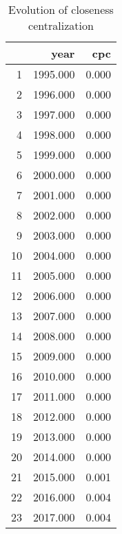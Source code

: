\begin{table}[ht]
\centering
\begin{tabular}{rrr}
  \hline
 & year & cpc \\ 
  \hline
1 & 1995.000 & 0.000 \\ 
  2 & 1996.000 & 0.000 \\ 
  3 & 1997.000 & 0.000 \\ 
  4 & 1998.000 & 0.000 \\ 
  5 & 1999.000 & 0.000 \\ 
  6 & 2000.000 & 0.000 \\ 
  7 & 2001.000 & 0.000 \\ 
  8 & 2002.000 & 0.000 \\ 
  9 & 2003.000 & 0.000 \\ 
  10 & 2004.000 & 0.000 \\ 
  11 & 2005.000 & 0.000 \\ 
  12 & 2006.000 & 0.000 \\ 
  13 & 2007.000 & 0.000 \\ 
  14 & 2008.000 & 0.000 \\ 
  15 & 2009.000 & 0.000 \\ 
  16 & 2010.000 & 0.000 \\ 
  17 & 2011.000 & 0.000 \\ 
  18 & 2012.000 & 0.000 \\ 
  19 & 2013.000 & 0.000 \\ 
  20 & 2014.000 & 0.000 \\ 
  21 & 2015.000 & 0.001 \\ 
  22 & 2016.000 & 0.004 \\ 
  23 & 2017.000 & 0.004 \\ 
   \hline
\end{tabular}
\caption{Evolution of closeness centralization} 
\end{table}
